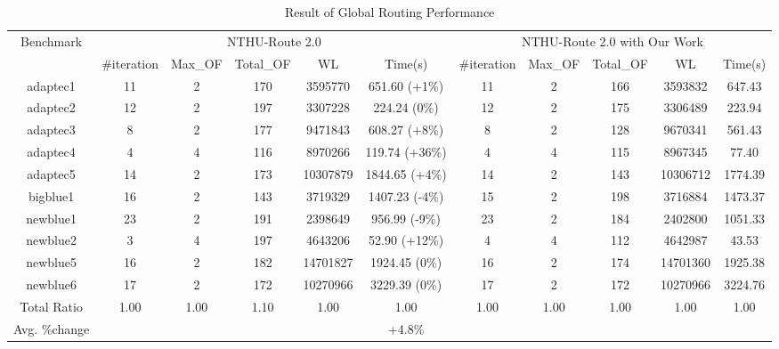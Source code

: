\begin{table*}[htbp]
\caption{Result of Global Routing Performance}
\begin{center}
\begin{tabular}{|c|c|c|c|c|c|c|c|c|c|c|}
\hline
\multirow{2}{*}{Benchmark} & \multicolumn{5}{c|}{NTHU-Route 2.0}                           & \multicolumn{5}{c|}{NTHU-Route 2.0 with Our Work}      \\ \cline{2-11} 
                           & \#iteration & Max\_OF & Total\_OF & WL       & Time(s)        & \#iteration & Max\_OF & Total\_OF & WL       & Time(s) \\ \hline
adaptec1                   & 11          & 2       & 170       & 3595770  & 651.60 (+1\%)  & 11          & 2       & 166       & 3593832  & 647.43  \\ \hline
adaptec2                   & 12          & 2       & 197       & 3307228  & 224.24 (0\%)   & 12          & 2       & 175       & 3306489  & 223.94  \\ \hline
adaptec3                   & 8           & 2       & 177       & 9471843  & 608.27 (+8\%)  & 8           & 2       & 128       & 9670341  & 561.43  \\ \hline
adaptec4                   & 4           & 4       & 116       & 8970266  & 119.74 (+36\%) & 4           & 4       & 115       & 8967345  & 77.40   \\ \hline
adaptec5                   & 14          & 2       & 173       & 10307879 & 1844.65 (+4\%) & 14          & 2       & 143       & 10306712 & 1774.39 \\ \hline
bigblue1                   & 16          & 2       & 143       & 3719329  & 1407.23 (-4\%) & 15          & 2       & 198       & 3716884  & 1473.37 \\ \hline
newblue1                   & 23          & 2       & 191       & 2398649  & 956.99 (-9\%)  & 23          & 2       & 184       & 2402800  & 1051.33 \\ \hline
newblue2                   & 3           & 4       & 197       & 4643206  & 52.90 (+12\%)        & 4           & 4       & 112       & 4642987  & 43.53   \\ \hline
newblue5                   & 16          & 2       & 182       & 14701827 & 1924.45 (0\%)  & 16          & 2       & 174       & 14701360 & 1925.38 \\ \hline
newblue6                   & 17          & 2       & 172       & 10270966 & 3229.39 (0\%)  & 17          & 2       & 172       & 10270966 & 3224.76 \\ \hline
Total Ratio         & 1.00           & 1.00       & 1.10      & 1.00     & 1.00           & 1.00           & 1.00       & 1.00         & 1.00        & 1.00       \\ \hline
Avg. \%change              &             &         &           &          & +4.8\%         &             &         &           &          &         \\ \hline
\end{tabular}
\label{tab:gr}
\end{center}
\end{table*}